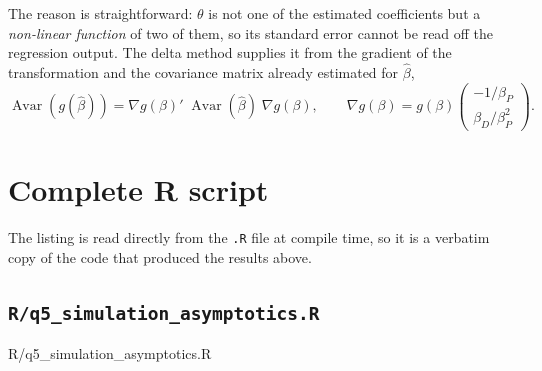 \documentclass[11pt]{article}
\newcommand{\code}[1]{\texttt{#1}}
\DeclareMathOperator{\Avar}{Avar}
\begin{document}
The reason is straightforward: $\theta$ is not one of the estimated
coefficients but a \emph{non-linear function} of two of them, so its standard
error cannot be read off the regression output. The delta method supplies it
from the gradient of the transformation and the covariance matrix already
estimated for $\hat\beta$,
\[
\Avar\!\left(g(\hat\beta)\right)
= \nabla g(\beta)' \; \Avar(\hat\beta) \; \nabla g(\beta),
\qquad
\nabla g(\beta) = g(\beta)
\begin{pmatrix}
-1/\beta_P \\[2pt]
\beta_D/\beta_P^2
\end{pmatrix}.
\]

\appendix
\section{Complete R script}
\label{app:code}

The listing is read directly from the \code{.R} file at compile time, so it is
a verbatim copy of the code that produced the results above.

\subsection{\texorpdfstring{\code{R/q5\_simulation\_asymptotics.R}}{R/q5\_simulation\_asymptotics.R}}
%
{R/q5_simulation_asymptotics.R}
\end{document}
